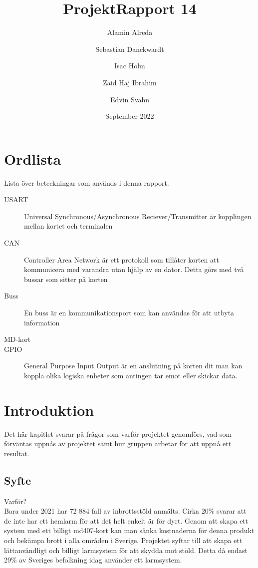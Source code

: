 \documentclass{article}
\title{ProjektRapport 14}
\author{Alamin Alreda \and Sebastian Danckwardt \and Isac Holm \and Zaid Haj Ibrahim   \and Edvin Svahn}
\date{September 2022}
\begin{document}
\maketitle

\section*{Ordlista}
Lista över beteckningar som används i denna rapport.
\begin{description}
    \item[USART] Universal Synchronous/Asynchronous Reciever/Transmitter är kopplingen mellan kortet och terminalen
    \item[CAN] Controller Area Network är ett protokoll som tillåter korten att kommunicera med varandra utan hjälp av en dator. Detta görs med två bussar som sitter på korten
    \item[Buss] En buss är en kommunikationsport som kan användas för att utbyta information
    \item[MD-kort]
    \item[GPIO] General Purpose Input Output är en anslutning på korten dit man kan koppla olika logiska enheter som antingen tar emot eller skickar data.
    
\end{description}
 \newpage
 
\section{Introduktion}
Det här kapitlet svarar på frågor som varför projektet genomförs,
vad som förväntas uppnås av projektet samt hur gruppen arbetar för att uppnå ett resultat.
\subsection{Syfte}
Varför?
\\
Bara under 2021 har 72 884 fall av inbrottsstöld anmälts\cite{BRa}. 
Cirka 20\% svarar att de inte har ett hemlarm för att det helt enkelt är för dyrt\cite{MoFor}.
Genom att skapa ett system med ett billigt md407-kort kan man sänka kostnaderna för denna produkt och bekämpa brott i alla områden i Sverige. 
Projektet syftar till att skapa ett lättanvändligt och billigt larmsystem för att skydda mot stöld. 
Detta då endast 29\% av Sveriges befolkning idag använder ett larmsystem\cite{SSF}.
\end{document}
